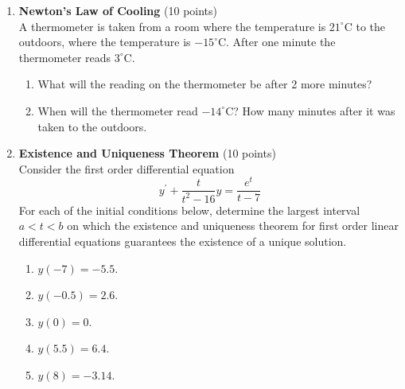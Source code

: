 \begin{enumerate}
  \item \textbf{Newton's Law of Cooling} (10 points)\\
  A thermometer is taken from a room where the temperature is 
  $21^{\circ} \mathrm{C}$ to the outdoors, where the temperature is 
  $-15^{\circ} \mathrm{C}$. After one minute the thermometer reads 
  $3^{\circ} \mathrm{C}$.
  \begin{enumerate}[label=(\alph*)]
    \item What will the reading on the thermometer be after 2 more minutes?\\
    \begin{subanswer}
    \end{subanswer}
    \item When will the thermometer read $-14^{\circ} \mathrm{C}$? How many 
    minutes after it was taken to the outdoors.\\
    \begin{subanswer}
    \end{subanswer}
  \end{enumerate}

  \item \textbf{Existence and Uniqueness Theorem} (10 points)\\
  Consider the first order differential equation
  $$
  y^{\prime}+\frac{t}{t^2-16} y=\frac{e^t}{t-7}
  $$
  For each of the initial conditions below, determine the largest interval $a<t<b$ on which the existence and uniqueness theorem for first order linear differential equations guarantees the existence of a unique solution.
  \begin{enumerate}[label=\alph*.]
    \item $y(-7)=-5.5$.
    \begin{subanswer}
    \end{subanswer}
    \item $y(-0.5)=2.6$.
    \begin{subanswer}
    \end{subanswer}
    \item $y(0)=0$.
    \begin{subanswer}
    \end{subanswer}
    \item $y(5.5)=6.4$.
    \begin{subanswer}
    \end{subanswer}
    \item $y(8)=-3.14$.
    \begin{subanswer}
    \end{subanswer}
  \end{enumerate}


\end{enumerate}
